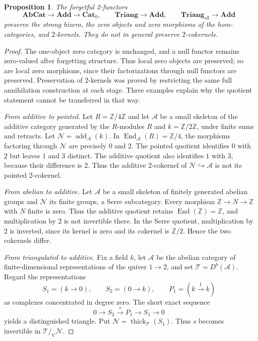 \documentclass[11pt,reqno,a4paper]{amsart}
\newtheorem{proposition}[theorem]{Proposition}
\theoremstyle{definition}
\theoremstyle{remark}
\newcommand{\A}{\mathcal{A}}
\newcommand{\N}{\mathcal{N}}
\newcommand{\T}{\mathcal{T}}
\newcommand{\0}{\mathbf{0}}
\renewcommand{\1}{\mathbf{1}}
\newcommand{\Triang}{\mathbf{Triang}}
\newcommand{\AbCat}{\mathbf{AbCat}}
\newcommand{\Pt}{\mathbf{Cat}_{0}}
\newcommand{\Add}{\mathbf{Add}}
\newcommand{\Tri}{\Triang}
\newcommand{\TriAll}{\mathbf{Triang}_{\mathrm{all}}}
\newcommand{\vq}[2]{#1/_{\!\mathrm V}#2}
\DeclareMathOperator{\add}{add}
\DeclareMathOperator{\thick}{thick}
\begin{document}
\begin{proposition}\label{prop:forgetful}
The forgetful 2-functors
\[
 \AbCat\longrightarrow\Add\longrightarrow\Pt,
 \qquad
 \Tri\longrightarrow\Add,
 \qquad
 \TriAll\longrightarrow\Add
\]
preserve the strong bizero, the zero objects and zero morphisms of
the hom-categories, and $2$-kernels. They do not in general preserve
$2$-cokernels.
\end{proposition}
\begin{proof}
The one-object zero category is unchanged, and a null functor
remains zero-valued after forgetting structure. Thus local zero
objects are preserved; so are local zero morphisms, since their
factorizations through null functors are preserved. Preservation of
$2$-kernels was proved by restricting the same full annihilation
construction at each stage. Three examples
explain why the quotient statement cannot be transferred in that way.

\emph{From additive to pointed.}
Let $R=\mathbb Z/4\mathbb Z$ and let $\A$ be a small skeleton of the
additive category generated by the $R$-modules $R$ and
$k=\mathbb Z/2\mathbb Z$, under finite sums and retracts. Let
$\N=\add_{\A}(k)$. In $\operatorname{End}_{\A}(R)=\mathbb Z/4$,
the morphisms factoring through $\N$ are precisely $0$ and $2$.
The pointed quotient identifies $0$ with $2$ but leaves $1$ and $3$
distinct. The additive quotient also identifies $1$ with $3$, because
their difference is $2$. Thus the additive 2-cokernel of
$\N\hookrightarrow\A$ is not its pointed 2-cokernel.

\emph{From abelian to additive.}
Let $\A$ be a small skeleton of finitely generated abelian groups and
$\N$ its finite groups, a Serre subcategory. Every morphism
$\mathbb Z\to N\to\mathbb Z$ with $N$ finite is zero. Thus the
additive quotient retains $\operatorname{End}(\mathbb Z)=\mathbb Z$,
and multiplication by $2$ is not invertible there. In the Serre quotient,
multiplication by $2$ is inverted, since its kernel is zero and its
cokernel is $\mathbb Z/2$. Hence the two cokernels differ.

\emph{From triangulated to additive.}
Fix a field $k$, let $\A$ be the abelian category of finite-dimensional
representations of the quiver $1\to2$, and set $\T=D^b(\A)$.
Regard the representations
\[
 S_1=(k\to0),\qquad S_2=(0\to k),\qquad P_1=(k\xrightarrow{1}k)
\]
as complexes concentrated in degree zero. The short exact sequence
\[
 0\longrightarrow S_2\xrightarrow{s}P_1\longrightarrow S_1
 \longrightarrow0
\]
yields a distinguished triangle. Put $\N=\thick_{\T}(S_1)$.
Thus $s$ becomes invertible in $\vq{\T}{\N}$.


\end{proof}
\end{document}
